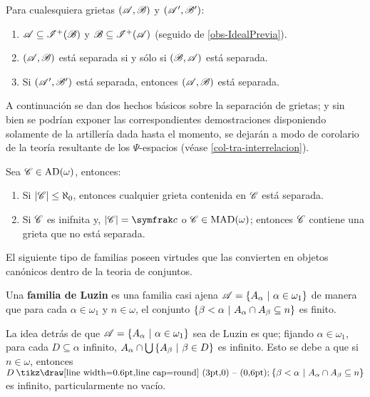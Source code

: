 \begin{observacion}\label{obs-GrietasSimple}
	Para cualesquiera grietas $(\mathscr{A},\mathscr{B})$ y $(\mathscr{A}',\mathscr{B}')$:
	\begin{enumerate}
		\item $\mathscr{A} \subseteq \mathscr{I}^+(\mathscr{B})$ y $\mathscr{B} \subseteq \mathscr{I}^+(\mathscr{A})$ (seguido de \autoref{obs-IdealPrevia}).
		\item $(\mathscr{A},\mathscr{B})$ está separada si y sólo si $(\mathscr{B},\mathscr{A})$ está separada.
		\item Si $(\mathscr{A}',\mathscr{B}')$ está separada, entonces $(\mathscr{A},\mathscr{B})$ está separada.
	\end{enumerate}
\end{observacion}

A continuación se dan dos hechos básicos sobre la separación de grietas; y sin bien se podrían exponer las correspondientes demostraciones disponiendo solamente de la artillería dada hasta el momento, se dejarán a modo de corolario de la teoría resultante de los $\Psi$-espacios (véase \ref{col-tra-interrelacion}).

\begin{ejemplo}\label{ej-interrelacion}
	Sea $\mathscr{C}\in \operatorname{AD}(\omega)$, entonces:
	\begin{enumerate}
		\item Si $|\mathscr{C}|\leq \aleph_0$, entonces cualquier grieta contenida en $\mathscr{C}$ está separada.
		\item Si $\mathscr{C}$ es inifnita y, $|\ms{C}|=\mathfrak{c}$ o $\mathscr{C}\in \operatorname{MAD}(\omega)$; entonces $\mathscr{C}$ contiene una grieta que no está separada.
	\end{enumerate}
\end{ejemplo}

El siguiente tipo de familias poseen virtudes que las convierten en objetos canónicos dentro de la teoria  de conjuntos.

\begin{definicion}\label{def-LuzinFam}
	Una \textbf{familia de Luzin} es una familia casi ajena $\mathscr{A}=\{A_\alpha \text{ $|$ } \alpha \in \omega_1 \}$ de manera que para cada $\alpha \in \omega_1$ y $n \in \omega$, el conjunto $ \{ \beta<\alpha \text{ $|$ } A_\alpha \cap A_\beta \subseteq n \} $ es finito.
\end{definicion}

La idea detrás de que $\mathscr{A}=\{A_\alpha \text{ $|$ } \alpha \in \omega_1 \}$ sea de Luzin es que; fijando $\alpha \in \omega_1$, para cada $D \subseteq \alpha$ infinito, $A_\alpha \cap \mbox{$\bigcup$}\,\{A_\beta \text{ $|$ } \beta \in D\}$ es infinito. Esto se debe a que si $n \in \omega$, entonces $D \setminus \{ \beta<\alpha \tq A_\alpha \cap A_\beta \subseteq n \} $ es infinito, particularmente no vacío.

